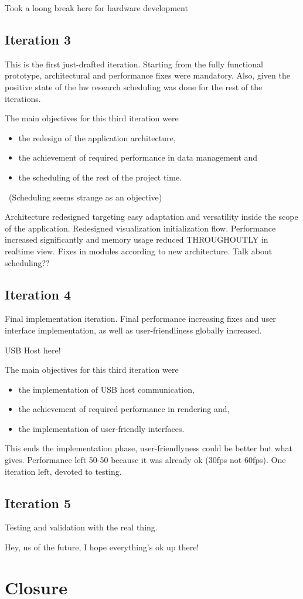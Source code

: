 			Took a loong break here for hardware development

		\subsection{Iteration 3}
			This is the first just-drafted iteration. Starting from the fully functional prototype, architectural and performance fixes were mandatory. Also, given the positive state of the hw research scheduling was done for the rest of the iterations.

			The main objectives for this third iteration were
			\begin{itemize} 
				\item the redesign of the application architecture, 
				\item the achievement of required performance in data management and
				\item the scheduling of the rest of the project time.
			\end{itemize}

			~(Scheduling seems strange as an objective)~

			Architecture redesigned targeting easy adaptation and versatility inside the scope of the application. Redesigned visualization initialization flow.
			Performance increased significantly and memory usage reduced THROUGHOUTLY in realtime view.
			Fixes in modules according to new architecture.
			Talk about scheduling??

		\subsection{Iteration 4}
			Final implementation iteration. Final performance increasing fixes and user interface implementation, as well as user-friendliness globally increased.

			USB Host here!

			The main objectives for this third iteration were
			\begin{itemize} 
				\item the implementation of USB host communication,
				\item the achievement of required performance in rendering and, 
				\item the implementation of user-friendly interfaces.
			\end{itemize}

			This ends the implementation phase, user-friendlyness could be better but what gives. 
			Performance left 50-50 because it was already ok (30fps not 60fps).
			One iteration left, devoted to testing.

		\subsection{Iteration 5}
			Testing and validation with the real thing.

			Hey, us of the future, I hope everything's ok up there!
			
	\section{Closure}
